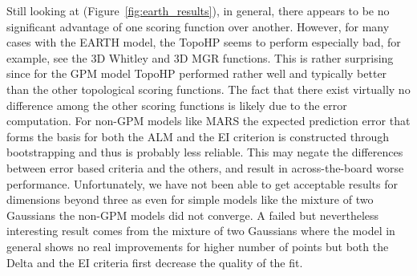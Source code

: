Still looking at (Figure~\ref{fig:earth_results}), in general, there appears to be no significant advantage of one scoring function over another.
However, for many cases with the EARTH model, the TopoHP seems to perform especially bad, for example, see the 3D Whitley and 3D MGR functions.
%
This is rather surprising since for the GPM model TopoHP performed rather well and typically better than the other topological scoring functions.
%
The fact that there exist virtually no difference among the other scoring functions is likely due to the error computation.
%
For non-GPM models like MARS the expected prediction error that forms the basis for both the ALM and the EI criterion is constructed through bootstrapping and thus is probably less reliable.
%
This may negate the differences between error based criteria and the others, and result in across-the-board worse performance.
%
Unfortunately, we have not been able to get acceptable results for dimensions beyond three as even for simple models like the mixture of two Gaussians the non-GPM models did not converge.
%
A failed but nevertheless interesting result comes from the mixture of two Gaussians where the model in general shows no real improvements for higher number of points but both the Delta and the EI criteria first decrease the quality of the fit.

